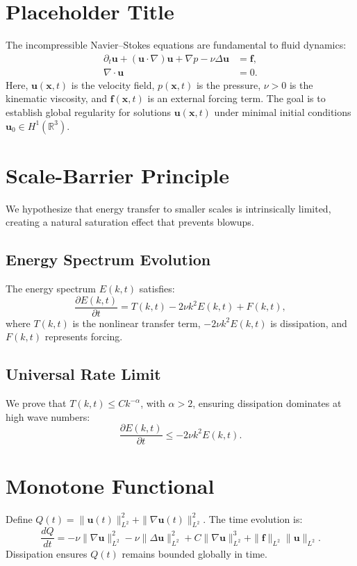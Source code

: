 \section{Placeholder Title}
The incompressible Navier--Stokes equations are fundamental to fluid dynamics:
\begin{align}
    \partial_t \mathbf{u} + (\mathbf{u} \cdot \nabla)\mathbf{u} + \nabla p - \nu \Delta \mathbf{u} &= \mathbf{f}, \label{eq:momentum} \\
    \nabla \cdot \mathbf{u} &= 0. \label{eq:incompressibility}
\end{align}
Here, \(\mathbf{u}(\mathbf{x}, t)\) is the velocity field, \(p(\mathbf{x}, t)\) is the pressure, \(\nu > 0\) is the kinematic viscosity, and \(\mathbf{f}(\mathbf{x}, t)\) is an external forcing term. The goal is to establish global regularity for solutions \(\mathbf{u}(\mathbf{x}, t)\) under minimal initial conditions \(\mathbf{u}_0 \in H^1(\mathbb{R}^3)\).

\section{Scale-Barrier Principle}
We hypothesize that energy transfer to smaller scales is intrinsically limited, creating a natural saturation effect that prevents blowups.
\subsection{Energy Spectrum Evolution}
The energy spectrum \(E(k, t)\) satisfies:
\begin{equation}
    \frac{\partial E(k, t)}{\partial t} = T(k, t) - 2\nu k^2 E(k, t) + F(k, t),
\end{equation}
where \(T(k, t)\) is the nonlinear transfer term, \(-2\nu k^2 E(k, t)\) is dissipation, and \(F(k, t)\) represents forcing.
\subsection{Universal Rate Limit}
We prove that \(T(k, t) \leq C k^{-\alpha}\), with \(\alpha > 2\), ensuring dissipation dominates at high wave numbers:
\begin{equation}
    \frac{\partial E(k, t)}{\partial t} \leq -2\nu k^2 E(k, t).
\end{equation}

\section{Monotone Functional}
Define \(Q(t) = \|\mathbf{u}(t)\|_{L^2}^2 + \|\nabla \mathbf{u}(t)\|_{L^2}^2\). The time evolution is:
\begin{equation}
    \frac{dQ}{dt} = -\nu \|\nabla \mathbf{u}\|_{L^2}^2 - \nu \|\Delta \mathbf{u}\|_{L^2}^2 + C \|\nabla \mathbf{u}\|_{L^2}^3 + \|\mathbf{f}\|_{L^2} \|\mathbf{u}\|_{L^2}.
\end{equation}
Dissipation ensures \(Q(t)\) remains bounded globally in time.

